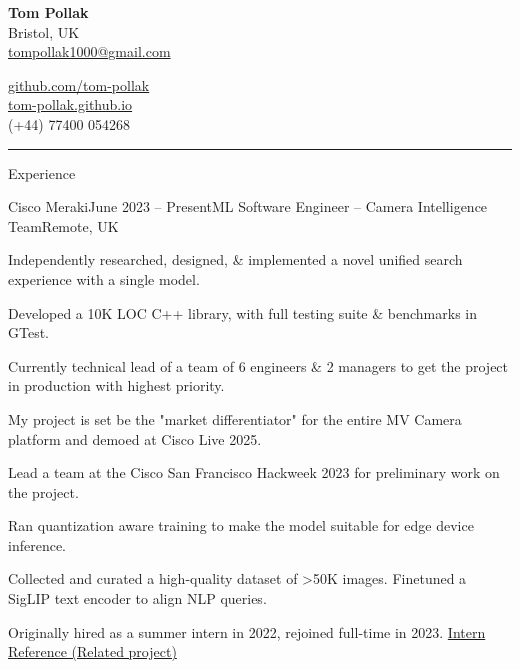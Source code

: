 \documentclass{structure}
\begin{document}
\parbox{0.5\textwidth}{
    {\namesize\textbf{Tom Pollak}} \\[6pt]
    Bristol, UK\\
    \href{mailto:tompollak1000@gmail.com}{tompollak1000@gmail.com}
}
\hfill
\parbox{0.5\textwidth}{
    \vspace*{10pt}

    \begin{flushright}

        \href{https://github.com/tom-pollak}{github.com/tom-pollak} \\
        \href{https://tom-pollak.github.io}{tom-pollak.github.io} \\
        (+44) 77400 054268
    \end{flushright}

}

\smallskip
\hrule
\smallskip


\begin{rSection}{Experience}

    \begin{rSubsection}{Cisco Meraki}{June 2023 -- Present}{ML Software Engineer -- Camera Intelligence Team}{Remote, UK}{}{}
        \item Independently researched, designed, \& implemented a novel unified search experience with a single model.
        \item Developed a 10K LOC C++ library, with full testing suite \& benchmarks in GTest.
        \item Currently technical lead of a team of 6 engineers \& 2 managers to get the project in production with highest priority.
        \item My project is set be the "market differentiator" for the entire MV Camera platform and demoed at Cisco Live 2025.
        \item Lead a team at the Cisco San Francisco Hackweek 2023 for preliminary work on the project.
        \item Ran quantization aware training to make the model suitable for edge device inference.
        \item Collected and curated a high-quality dataset of >50K images. Finetuned a SigLIP text encoder to align NLP queries.
        \item Originally hired as a summer intern in 2022, rejoined full-time in 2023. \href{https://gist.githubusercontent.com/tom-pollak/1a2e8c1fc61ba269e25c73c02c78007c/raw/45c8cbceda8cd745d6d00cb16a09979778df663b/gistfile1.txt}{{\color{blue}Intern Reference} (Related project)}
    \end{rSubsection}

\end{rSection}
\end{document}

